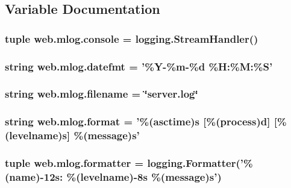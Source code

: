 \subsection{Variable Documentation}
\hypertarget{namespaceweb_1_1mlog_a584640685df4cef6445090f31fb29746}{
\subsubsection[{console}]{\setlength{\rightskip}{0pt plus 5cm}tuple web.\-mlog.\-console = logging.\-Stream\-Handler()}}\label{namespaceweb_1_1mlog_a584640685df4cef6445090f31fb29746}
\hypertarget{namespaceweb_1_1mlog_a9b58771f85f132788f53c33d98d8cb30}{
\subsubsection[{datefmt}]{\setlength{\rightskip}{0pt plus 5cm}string web.\-mlog.\-datefmt = '\%Y-\/\%m-\/\%d \%H\-:\%M\-:\%S'}}\label{namespaceweb_1_1mlog_a9b58771f85f132788f53c33d98d8cb30}
\hypertarget{namespaceweb_1_1mlog_a538c912597a5d2ac200d6932d02cac96}{
\subsubsection[{filename}]{\setlength{\rightskip}{0pt plus 5cm}string web.\-mlog.\-filename = \char`\"{}server.\-log\char`\"{}}}\label{namespaceweb_1_1mlog_a538c912597a5d2ac200d6932d02cac96}
\hypertarget{namespaceweb_1_1mlog_a00f8125e9f17157323540a7e1a1d87e1}{
\subsubsection[{format}]{\setlength{\rightskip}{0pt plus 5cm}string web.\-mlog.\-format = '\%(asctime)s \mbox{[}\%(process)d\mbox{]} \mbox{[}\%(levelname)s\mbox{]} \%(message)s'}}\label{namespaceweb_1_1mlog_a00f8125e9f17157323540a7e1a1d87e1}
\hypertarget{namespaceweb_1_1mlog_a202732635fa47983472657e9eaba3a88}{
\subsubsection[{formatter}]{\setlength{\rightskip}{0pt plus 5cm}tuple web.\-mlog.\-formatter = logging.\-Formatter('\%(name)-\/12s\-: \%(levelname)-\/8s \%(message)s')}}\label{namespaceweb_1_1mlog_a202732635fa47983472657e9eaba3a88}
